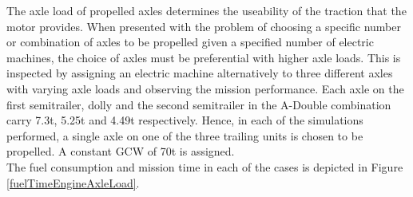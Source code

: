 \documentclass{article}
\begin{document}
The axle load of propelled axles determines the useability of the traction that the motor provides. When presented with the problem of choosing a specific number or combination of axles to be propelled given a specified number of electric machines, the choice of axles must be preferential with higher axle loads. This is inspected by assigning an electric machine alternatively to three different axles with varying axle loads and observing the mission performance. Each axle on the first semitrailer, dolly and the second semitrailer in the A-Double combination carry 7.3t, 5.25t and 4.49t respectively. Hence, in each of the simulations performed, a single axle on one of the three trailing units is chosen to be propelled. A constant GCW of 70t is assigned.\\

The fuel consumption and mission time in each of the cases is depicted in Figure \ref{fuelTimeEngineAxleLoad}. 
\end{document}
